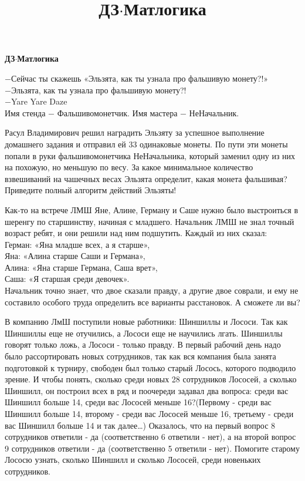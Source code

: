 \centerline{\bf \Huge ДЗ$\cdot$Матлогика}
\title{ДЗ$\cdot$Матлогика}
\begin{flushright}
    \scriptsize $-$Сейчас ты скажешь «Эльзята, как ты узнала про фальшивую монету?!»\\
    $-$Эльзята, как ты узнала про фальшивую монету?!\\
    $-$Yare Yare Daze\\
    Имя стенда $-$ Фальшивомонетчик. Имя мастера $-$ НеНачальник.\\
\end{flushright}
 Расул Владимирович решил наградить Эльзяту за успешное выполнение домашнего задания и отправил ей 33 одинаковые монеты. По пути эти монеты попали в руки фальшивомонетчика НеНачальника, который заменил одну из них на похожую, но меньшую по весу. За какое минимальное количество взвешиваний на чашечных весах Эльзята определит, какая монета фальшивая? Приведите полный алгоритм действий Эльзяты!

Как-то на встрече ЛМШ Яне, Алине, Герману и Саше нужно было выстроиться в шеренгу по старшинству, начиная с младшего. Начальник ЛМШ не знал точный возраст ребят, и они решили над ним подшутить.
Каждый из них сказал:\\
Герман: «Яна младше всех, а я старше»,\\
Яна: «Алина старше Саши и Германа»,\\
Алина: «Яна старше Германа, Саша врет»,\\
Саша: «Я старшая среди девочек».\\
Начальник точно знает, что двое сказали правду, а другие двое соврали, и ему не составило особого труда определить все варианты расстановок. А сможете ли вы?

 В компанию ЛмШ поступили новые работники: Шиншиллы и Лососи. Так как Шиншиллы еще не отучились, а Лососи еще не научились лгать. Шиншиллы говорят только ложь, а Лососи - только правду.
В первый рабочий день надо было рассортировать новых сотрудников, так как вся компания была занята подготовкой к турниру, свободен был только старый Лосось, которого подводило зрение. И чтобы понять, сколько среди новых 28 сотрудников Лососей, а сколько Шиншилл, он построил всех в ряд и поочереди задавал два вопроса: среди вас Шиншилл больше 14, среди вас Лососей меньше 16?(Первому - среди вас Шиншилл больше 14, второму - среди вас Лососей меньше 16, третьему - среди вас Шиншилл больше 14 и так далее…)
Оказалось, что на первый вопрос 8 сотрудников ответили - да (соответственно 6 ответили - нет), а на второй вопрос 9 сотрудников ответили - да (соответственно 5 ответили - нет).
Помогите старому Лососю узнать, сколько Шиншилл и сколько Лососей, среди новеньких сотрудников.